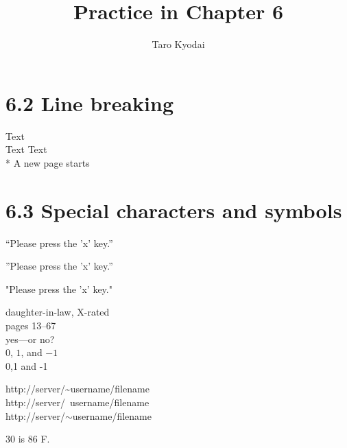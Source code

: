 \documentclass{article}
\title{Practice in Chapter 6} %
\author{Taro Kyodai} %
\begin{document}
\maketitle %

\tableofcontents %

\section{6.2 Line breaking}

Text\\ %
Text\newline %
Text\\* %
A new page starts\newpage %

\section{6.3 Special characters and symbols}

``Please press the 'x' key.''

''Please press the 'x' key.''

"Please press the 'x' key."


daughter-in-law, X-rated\\
pages 13--67\\
yes---or no? \\
$0$, $1$, and $-1$ \\ %
0,1 and -1

http://server/\~{}username/filename\\ 
http://server/~username/filename\\ %
http://server/$\sim$username/filename

30 \textcelsius{} is 86 \textdegree{}F.
\end{document}
